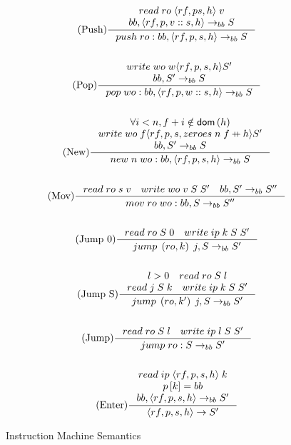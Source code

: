 \begin{figure}
\begin{gather*}
\tag{Push}
\inference{
read \; ro \; \langle rf, p s, h \rangle \; v \\
bb, \langle rf, p, v::s, h \rangle \rightarrow_{bb} S 
}{push \; ro : bb, \langle rf, p, s, h \rangle \rightarrow_{bb} S} \\ \\
\tag{Pop}
\inference{
write \; wo \; w \langle rf, p, s, h \rangle S' \\
bb, S' \rightarrow_{bb} S \\
}{pop \; wo:bb, \langle rf, p, w::s, h \rangle \rightarrow_{bb} S}  \\ \\
\tag{New} \inference{
\forall i < n, f+i \notin \textsf{dom}\left(h\right) \\
write \; wo \; f \langle rf, p, s, zeroes \; n \; f \concat h \rangle S' \\
bb, S' \rightarrow_{bb} S
}{new \; n \; wo:bb, \langle rf, p, s, h \rangle \rightarrow_{bb} S} \\ \\
\tag{Mov} \inference{
read \; ro \; s \; v \quad
write \; wo \; v \; S \; S' \quad
bb, S' \rightarrow_{bb} S''
}{mov \; ro \; wo:bb, S \rightarrow_{bb} S''} \\ \\
\tag{Jump 0} \inference{
read \; ro \; S \; 0 \quad
write \; ip \; k \; S \; S'
}{jump \; \left(ro, k\right) \; j, S \rightarrow_{bb} S'} \\ \\
\tag{Jump S} \inference{
l > 0 \quad 
read \; ro \; S \; l \\
read \; j \; S \; k \quad
write \; ip \; k \; S \; S'
}{jump \; \left(ro, k'\right) \; j, S \rightarrow_{bb} S'} \\ \\
\tag{Jump} \inference{
read \; ro \; S \; l \quad
write \; ip \; l \; S \; S'
}{jump \; ro:S \rightarrow_{bb} S'} \\ \\
\tag{Enter} \inference{
read \; ip \; \langle rf, p, s, h \rangle \; k \\
p\left[k\right] = bb \\
bb, \langle rf, p, s, h \rangle \rightarrow_{bb} S' 
}{\langle rf, p, s, h \rangle \rightarrow S'}
\end{gather*}
\caption{Instruction Machine Semantics}
\label{fig:im_semantics}
\end{figure}

